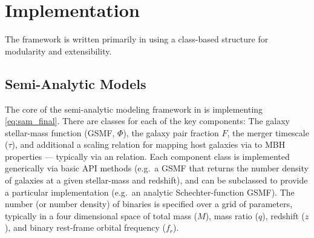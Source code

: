 

\section{Implementation}
    \label{sec:imp}

    The \holodeck{} framework is written primarily in \python{} using a class-based structure for modularity and extensibility.

    \subsection{Semi-Analytic Models}
        \label{sec:imp_sam}





        The core of the semi-analytic modeling framework in \holodeck{} is implementing \eqref{eq:sam_final}.  There are classes for each of the key components: The galaxy stellar-mass function (GSMF, $\Phi$), the galaxy pair fraction \(F\), the merger timescale ($\tau$), and additional a scaling relation for mapping host galaxies via to MBH properties --- typically via an \mmbulge{} relation.  Each component class is implemented generically via basic API methods (e.g.~a GSMF that returns the number density of galaxies at a given stellar-mass and redshift), and can be subclassed to provide a particular implementation (e.g.~an analytic Schechter-function GSMF).  The number (or number density) of binaries is specified over a grid of parameters, typically in a four dimensional space of total mass ($M$), mass ratio ($q$), redshift ($z$), and binary rest-frame orbital frequency ($f_r$).

